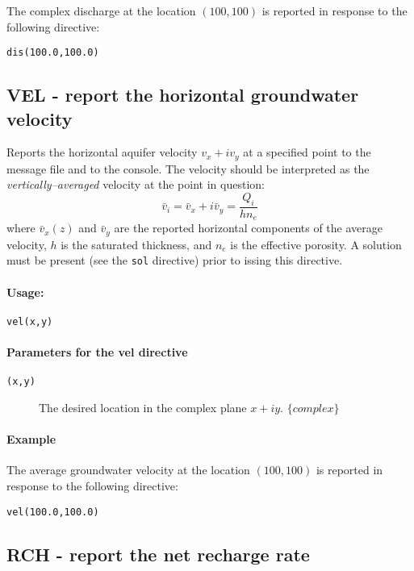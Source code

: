 The complex discharge at the location $(100,100)$ is reported in
response to the following directive:
\begin{verbatim}
dis(100.0,100.0)
\end{verbatim}

\subsection{\label{VEL_directive}VEL - report the horizontal groundwater velocity }

Reports the horizontal aquifer velocity $v_{x}+iv_{y}$ at a specified
point to the message file and to the console. The velocity should
be interpreted as the \emph{vertically--averaged} velocity at the
point in question:
\[
\bar{v}_{i}=\bar{v}_{x}+i\bar{v}_{y}=\frac{Q_{i}}{hn_{e}}
\]
 where $\bar{v}_{x}(z)$ and $\bar{v}_{y}$ are the reported horizontal
components of the average velocity, $h$ is the saturated thickness,
and $n_{e}$ is the effective porosity. A solution must be present
(see the \texttt{sol} directive) prior to issing this directive. 


\paragraph{Usage:}
\begin{verbatim}
vel(x,y)
\end{verbatim}

\paragraph{Parameters for the \textsf{vel} directive }
\begin{description}
\item [{\texttt{(x,y)}}] The desired location in the complex plane $x+iy$.
$\{complex\}$
\end{description}

\paragraph{Example}

The average groundwater velocity at the location $(100,100)$ is reported
in response to the following directive:
\begin{verbatim}
vel(100.0,100.0)
\end{verbatim}

\subsection{\label{RCH_directive}RCH - report the net recharge rate}

